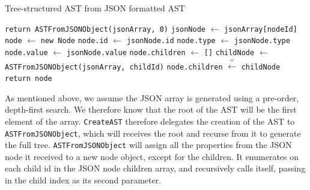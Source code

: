 \begin{algorithm}
  \caption{\label{alg:json-to-ast}Tree-structured AST from JSON formatted AST}
  \begin{algorithmic}[1]
      \State \lstinline{return ASTFromJSONObject(jsonArray, 0)}
    \EndFunction%
      \State \lstinline{jsonNode} $\gets$ \lstinline{jsonArray[nodeId]}
      \State \lstinline{node} $\gets$ \lstinline{new Node}
      \State \lstinline{node.id} $\gets$ \lstinline{jsonNode.id}
      \State \lstinline{node.type} $\gets$ \lstinline{jsonNode.type}
      \State \lstinline{node.value} $\gets$ \lstinline{jsonNode.value}
      \State \lstinline{node.children} $\gets$ \lstinline{[]}
        \State \lstinline{childNode} $\gets$
        \lstinline{ASTFromJSONObject(jsonArray, childId)}
        \State \lstinline{node.children} $\overset{+}{\leftarrow}$ \lstinline{childNode}
      \EndFor
      \State \lstinline{return node}
    \EndFunction%
  \end{algorithmic}
\end{algorithm}
As mentioned above, we assume the JSON array is generated using a pre-order,
depth-first search. We therefore know that the root of the AST will be the first
element of the array. \lstinline{CreateAST} therefore delegates the creation of
the AST to \lstinline{ASTFromJSONObject}, which will receives the root and
recurse from it to generate the full tree. \lstinline{ASTFromJSONObject} will
assign all the properties from the JSON node it received to a new node object,
except for the children. It enumerates on each child id in the JSON node
children array, and recursively calls itself, passing in the child index as its
second parameter.

